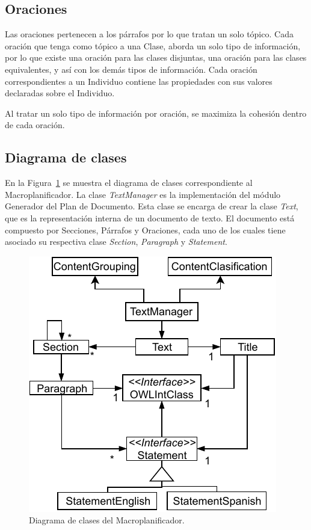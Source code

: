 \subsection{Oraciones}
Las oraciones pertenecen a los párrafos por lo que tratan un solo tópico. Cada oración que tenga como tópico a una Clase,  aborda un solo tipo de información, por lo que existe una oración para las clases disjuntas, una oración para las clases equivalentes, y así con los demás tipos de información. Cada oración correspondientes a un Individuo contiene las propiedades con sus valores declaradas sobre el Individuo.

Al tratar un solo tipo de información por oración, se maximiza la cohesión dentro de cada oración.


\subsection{Diagrama de clases}
En la Figura~\ref{fig:diagrama_clases_macroplanificador} se muestra el diagrama de clases correspondiente al Macroplanificador. La clase \emph{TextManager} es la implementación del módulo Generador del Plan de Documento. Esta clase se encarga de crear la clase \emph{Text}, que es la representación interna de un documento de texto. El documento está compuesto por Secciones, Párrafos y Oraciones, cada uno de los cuales tiene asociado su respectiva clase \emph{Section}, \emph{Paragraph} y \emph{Statement}.

\begin{figure}
    \centering
    \includegraphics{img/generacion_documento/diagrama_clases_macroplanificador.pdf}
    \caption{Diagrama de clases del Macroplanificador.}
    \label{fig:diagrama_clases_macroplanificador}
\end{figure}

